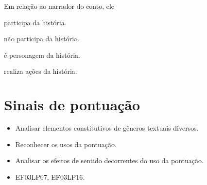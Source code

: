 Em relação ao narrador do conto, ele

\begin{escolha}
\item participa da história.

\item não participa da história.

\item é personagem da história.

\item realiza ações da história.
\end{escolha}

\chapter{Sinais de pontuação}



\begin{itemize}
  \item Analisar elementos constitutivos de gêneros textuais diversos.
  \item Reconhecer os usos da pontuação.
  \item Analisar os efeitos de sentido decorrentes do uso da pontuação.
\end{itemize}


\begin{itemize}
  \item EF03LP07, EF03LP16.
\end{itemize}

